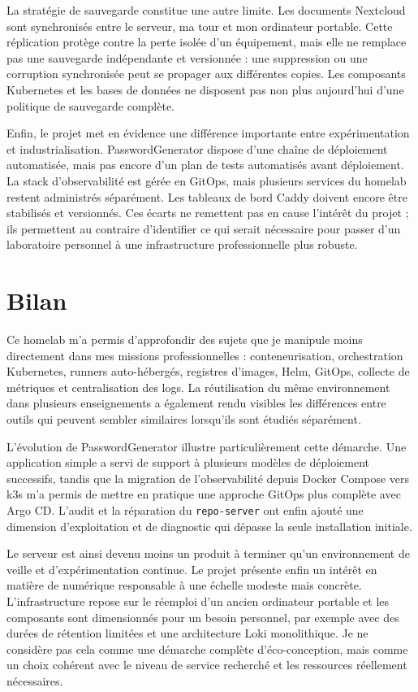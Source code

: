 La stratégie de sauvegarde constitue une autre limite. Les documents Nextcloud sont synchronisés entre le serveur, ma tour et mon ordinateur portable. Cette réplication protège contre la perte isolée d'un équipement, mais elle ne remplace pas une sauvegarde indépendante et versionnée : une suppression ou une corruption synchronisée peut se propager aux différentes copies. Les composants Kubernetes et les bases de données ne disposent pas non plus aujourd'hui d'une politique de sauvegarde complète.

Enfin, le projet met en évidence une différence importante entre expérimentation et industrialisation. PasswordGenerator dispose d'une chaîne de déploiement automatisée, mais pas encore d'un plan de tests automatisés avant déploiement. La stack d'observabilité est gérée en GitOps, mais plusieurs services du homelab restent administrés séparément. Les tableaux de bord Caddy doivent encore être stabilisés et versionnés. Ces écarts ne remettent pas en cause l'intérêt du projet ; ils permettent au contraire d'identifier ce qui serait nécessaire pour passer d'un laboratoire personnel à une infrastructure professionnelle plus robuste.

\section{Bilan}

Ce homelab m'a permis d'approfondir des sujets que je manipule moins directement dans mes missions professionnelles : conteneurisation, orchestration Kubernetes, runners auto-hébergés, registres d'images, Helm, GitOps, collecte de métriques et centralisation des logs. La réutilisation du même environnement dans plusieurs enseignements a également rendu visibles les différences entre outils qui peuvent sembler similaires lorsqu'ils sont étudiés séparément.

L'évolution de PasswordGenerator illustre particulièrement cette démarche. Une application simple a servi de support à plusieurs modèles de déploiement successifs, tandis que la migration de l'observabilité depuis Docker Compose vers k3s m'a permis de mettre en pratique une approche GitOps plus complète avec Argo CD. L'audit et la réparation du \texttt{repo-server} ont enfin ajouté une dimension d'exploitation et de diagnostic qui dépasse la seule installation initiale.

Le serveur est ainsi devenu moins un produit à terminer qu'un environnement de veille et d'expérimentation continue. Le projet présente enfin un intérêt en matière de numérique responsable à une échelle modeste mais concrète. L'infrastructure repose sur le réemploi d'un ancien ordinateur portable et les composants sont dimensionnés pour un besoin personnel, par exemple avec des durées de rétention limitées et une architecture Loki monolithique. Je ne considère pas cela comme une démarche complète d'éco-conception, mais comme un choix cohérent avec le niveau de service recherché et les ressources réellement nécessaires.